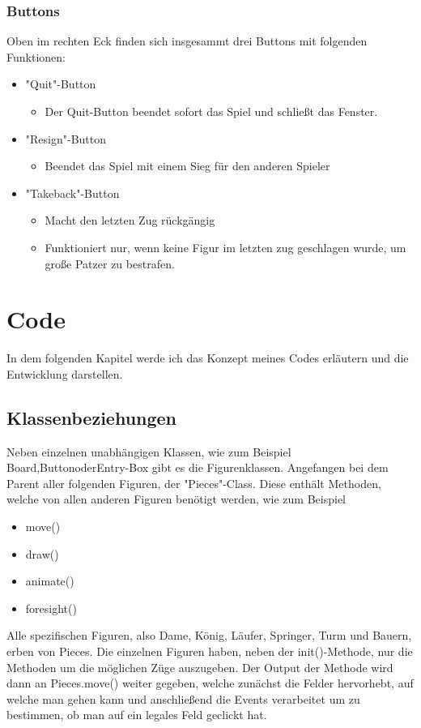 \documentclass[a4paper, 10pt]{scrartcl}
\begin{document}
\subsubsection{Buttons}
Oben im rechten Eck finden sich insgesammt drei Buttons mit folgenden Funktionen:
\begin{itemize}
        \item "Quit"-Button
        \begin{itemize}
                \item Der Quit-Button beendet sofort das Spiel und schließt das Fenster.
        \end{itemize}
        \item "Resign"-Button
        \begin{itemize}
                \item Beendet das Spiel mit einem Sieg für den anderen Spieler
        \end{itemize}
        \item "Takeback"-Button
        \begin{itemize}
                \item Macht den letzten Zug rückgängig
                \item Funktioniert nur, wenn keine Figur im letzten zug geschlagen wurde, um große Patzer zu bestrafen.
        \end{itemize}
\end{itemize}



\section{Code}
In dem folgenden Kapitel werde ich das Konzept meines Codes erläutern und die Entwicklung darstellen. 

\subsection{Klassenbeziehungen}
Neben einzelnen unabhängigen Klassen, wie zum Beispiel
\glqq Board\grqq{},\glqq Button\grqq{}oder\glqq Entry-Box\grqq{}
gibt es die Figurenklassen. Angefangen bei dem Parent aller folgenden Figuren, der "Pieces"-Class.
Diese enthält Methoden, welche von allen anderen Figuren benötigt werden, wie zum Beispiel
\begin{itemize}
        \item move()
        \item draw()
        \item animate()
        \item foresight()
\end{itemize}
Alle spezifischen Figuren, also Dame, König, Läufer, Springer, Turm und Bauern, erben von Pieces.
Die einzelnen Figuren haben, neben der init()-Methode, nur die Methoden um die möglichen Züge auszugeben. 
Der Output der Methode wird dann an Pieces.move() weiter gegeben, welche zunächst die Felder hervorhebt, auf welche man gehen kann und anschließend
die Events verarbeitet um zu bestimmen, ob man auf ein legales Feld geclickt hat. 
\end{document}
